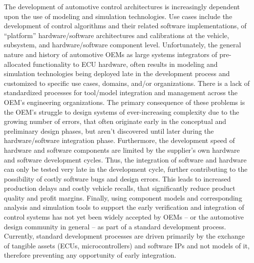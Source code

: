 The development of automotive control architectures is increasingly dependent upon the use of modeling and simulation technologies.
Use cases include the development of control algorithms and their related software implementations,
of “platform” hardware/software architectures
and calibrations at the vehicle, subsystem, and hardware/software component level.
Unfortunately, the general nature and history of automotive OEMs as large systems integrators of pre-allocated functionality to ECU hardware,
often results in modeling and simulation technologies being deployed %
late in the development process
and customized to specific use cases, domains, and/or organizations.
There is a lack of standardized processes for tool/model integration and management across the OEM's engineering organizations. 
The primary consequence of these problems is the OEM's struggle to design systems of ever-increasing complexity due to the growing number of errors,
that often originate early in the conceptual and preliminary design phases, but aren't discovered until later during the hardware/software integration phase.
Furthermore, the development speed of hardware and software components
are limited by the supplier's own hardware and software development cycles.
Thus, the integration of software and hardware can only be tested very late in the development cycle,
further contributing to the possibility of costly software bugs and design errors.
This leads to increased production delays and costly vehicle recalls, that significantly reduce product quality and profit margins.
Finally, using component models and corresponding analysis and simulation tools to support the early verification and integration of control systems has not yet been widely accepted by OEMs
-- or the automotive design community in general --
as part of a standard development process.
Currently, standard development processes are driven primarily by the exchange of tangible assets (ECUs, microcontrollers) and software IPs
and not models of it, therefore preventing any opportunity of early integration.


